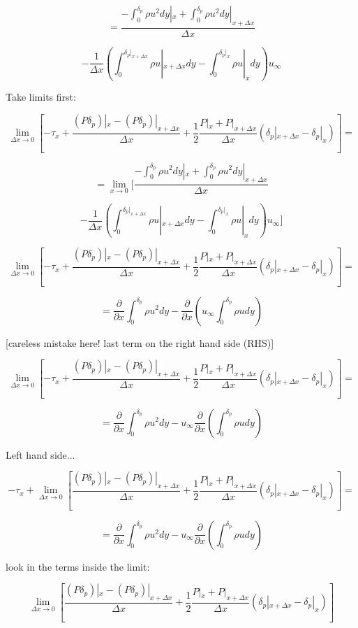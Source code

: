 \documentclass[11pt]{article}
\begin{document}
$$=  \frac{- \int_0^{\delta_p} \rho u^2 dy |_x +   \int_0^{\delta_p} \rho u^2 dy |_{x+\Delta x}}{\Delta x}  $$

$$ - \frac{1}{\Delta x} (  \int_0^{\delta_p |_{x+\Delta x}} \rho u |_{x+ \Delta x}dy -  \int_0^{\delta_p |_{x}} \rho u |_{x}dy) u_\infty  $$

Take limits first:

$$ \lim_{\Delta x \rightarrow 0} [-\tau_x   + \frac{(P \delta_p )|_x -  (P \delta_p )|_{x+\Delta x}}{\Delta x}  + \frac{1}{2} \frac{P|_x + P|_{x+\Delta x}}{\Delta x} (\delta_p|_{x+\Delta x} - \delta_p|_{x})] = $$

$$=  \lim_{x \rightarrow 0}[ \frac{- \int_0^{\delta_p} \rho u^2 dy |_x +   \int_0^{\delta_p} \rho u^2 dy |_{x+\Delta x}}{\Delta x}  $$

$$ - \frac{1}{\Delta x} (  \int_0^{\delta_p |_{x+\Delta x}} \rho u |_{x+ \Delta x}dy -  \int_0^{\delta_p |_{x}} \rho u |_{x}dy) u_\infty]   $$

$$ \lim_{\Delta x \rightarrow 0} [-\tau_x   + \frac{(P \delta_p )|_x -  (P \delta_p )|_{x+\Delta x}}{\Delta x}  + \frac{1}{2} \frac{P|_x + P|_{x+\Delta x}}{\Delta x} (\delta_p|_{x+\Delta x} - \delta_p|_{x})] = $$

$$=  \frac{\partial }{\partial x} \int_0^{\delta_p} \rho u^2 dy    - \frac{\partial }{\partial x} (u_\infty \int_0^{\delta_p } \rho u dy )   $$

[careless mistake here! last term on the right hand side (RHS)]

$$ \lim_{\Delta x \rightarrow 0} [-\tau_x   + \frac{(P \delta_p )|_x -  (P \delta_p )|_{x+\Delta x}}{\Delta x}  + \frac{1}{2} \frac{P|_x + P|_{x+\Delta x}}{\Delta x} (\delta_p|_{x+\Delta x} - \delta_p|_{x})] = $$

$$=  \frac{\partial }{\partial x} \int_0^{\delta_p} \rho u^2 dy    - u_\infty \frac{\partial }{\partial x} ( \int_0^{\delta_p } \rho u dy )   $$

Left hand side...

$$ -\tau_x   +  \lim_{\Delta x \rightarrow 0} [\frac{(P \delta_p )|_x -  (P \delta_p )|_{x+\Delta x}}{\Delta x}  + \frac{1}{2} \frac{P|_x + P|_{x+\Delta x}}{\Delta x} (\delta_p|_{x+\Delta x} - \delta_p|_{x})] = $$

$$=  \frac{\partial }{\partial x} \int_0^{\delta_p} \rho u^2 dy    - u_\infty  \frac{\partial }{\partial x} (\int_0^{\delta_p } \rho u dy )   $$

look in the terms inside the limit:

$$\lim_{\Delta x \rightarrow 0} [\frac{(P \delta_p )|_x -  (P \delta_p )|_{x+\Delta x}}{\Delta x}  + \frac{1}{2} \frac{P|_x + P|_{x+\Delta x}}{\Delta x} (\delta_p|_{x+\Delta x} - \delta_p|_{x})] $$
\end{document}
